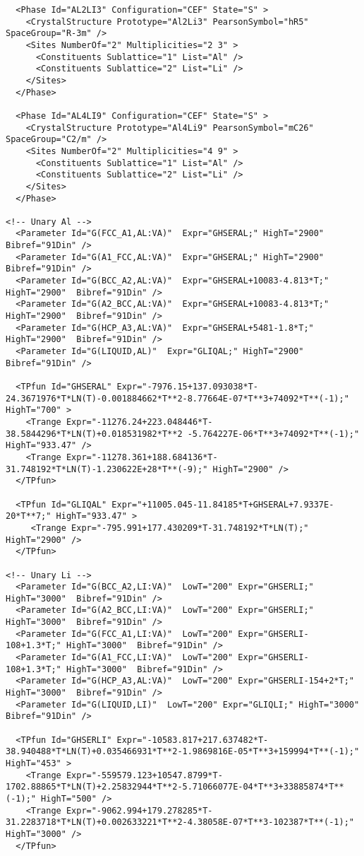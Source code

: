 \documentclass{article}
\begin{document}
\begin{appendices}
\begin{verbatim}
  <Phase Id="AL2LI3" Configuration="CEF" State="S" >
	<CrystalStructure Prototype="Al2Li3" PearsonSymbol="hR5" SpaceGroup="R-3m" />
    <Sites NumberOf="2" Multiplicities="2 3" >
      <Constituents Sublattice="1" List="Al" />
      <Constituents Sublattice="2" List="Li" />
    </Sites>
  </Phase>

  <Phase Id="AL4LI9" Configuration="CEF" State="S" >
	<CrystalStructure Prototype="Al4Li9" PearsonSymbol="mC26" SpaceGroup="C2/m" />
    <Sites NumberOf="2" Multiplicities="4 9" >
      <Constituents Sublattice="1" List="Al" />
      <Constituents Sublattice="2" List="Li" />
    </Sites>
  </Phase>

<!-- Unary Al -->
  <Parameter Id="G(FCC_A1,AL:VA)"  Expr="GHSERAL;" HighT="2900"  Bibref="91Din" />
  <Parameter Id="G(A1_FCC,AL:VA)"  Expr="GHSERAL;" HighT="2900"  Bibref="91Din" />
  <Parameter Id="G(BCC_A2,AL:VA)"  Expr="GHSERAL+10083-4.813*T;" HighT="2900"  Bibref="91Din" />
  <Parameter Id="G(A2_BCC,AL:VA)"  Expr="GHSERAL+10083-4.813*T;" HighT="2900"  Bibref="91Din" />
  <Parameter Id="G(HCP_A3,AL:VA)"  Expr="GHSERAL+5481-1.8*T;" HighT="2900"  Bibref="91Din" />
  <Parameter Id="G(LIQUID,AL)"  Expr="GLIQAL;" HighT="2900"  Bibref="91Din" />

  <TPfun Id="GHSERAL" Expr="-7976.15+137.093038*T-24.3671976*T*LN(T)-0.001884662*T**2-8.77664E-07*T**3+74092*T**(-1);" HighT="700" >
    <Trange Expr="-11276.24+223.048446*T-38.5844296*T*LN(T)+0.018531982*T**2 -5.764227E-06*T**3+74092*T**(-1);" HighT="933.47" /> 
    <Trange Expr="-11278.361+188.684136*T-31.748192*T*LN(T)-1.230622E+28*T**(-9);" HighT="2900" /> 
  </TPfun>

  <TPfun Id="GLIQAL" Expr="+11005.045-11.84185*T+GHSERAL+7.9337E-20*T**7;" HighT="933.47" >
     <Trange Expr="-795.991+177.430209*T-31.748192*T*LN(T);" HighT="2900" /> 
  </TPfun>

<!-- Unary Li -->
  <Parameter Id="G(BCC_A2,LI:VA)"  LowT="200" Expr="GHSERLI;" HighT="3000"  Bibref="91Din" />
  <Parameter Id="G(A2_BCC,LI:VA)"  LowT="200" Expr="GHSERLI;" HighT="3000"  Bibref="91Din" />
  <Parameter Id="G(FCC_A1,LI:VA)"  LowT="200" Expr="GHSERLI-108+1.3*T;" HighT="3000"  Bibref="91Din" />
  <Parameter Id="G(A1_FCC,LI:VA)"  LowT="200" Expr="GHSERLI-108+1.3*T;" HighT="3000"  Bibref="91Din" />
  <Parameter Id="G(HCP_A3,AL:VA)"  LowT="200" Expr="GHSERLI-154+2*T;" HighT="3000"  Bibref="91Din" />
  <Parameter Id="G(LIQUID,LI)"  LowT="200" Expr="GLIQLI;" HighT="3000"  Bibref="91Din" />

  <TPfun Id="GHSERLI" Expr="-10583.817+217.637482*T-38.940488*T*LN(T)+0.035466931*T**2-1.9869816E-05*T**3+159994*T**(-1);" HighT="453" >
    <Trange Expr="-559579.123+10547.8799*T-1702.88865*T*LN(T)+2.25832944*T**2-5.71066077E-04*T**3+33885874*T**(-1);" HighT="500" /> 
    <Trange Expr="-9062.994+179.278285*T-31.2283718*T*LN(T)+0.002633221*T**2-4.38058E-07*T**3-102387*T**(-1);" HighT="3000" /> 
  </TPfun>


\end{verbatim}
\end{appendices}
\end{document}
